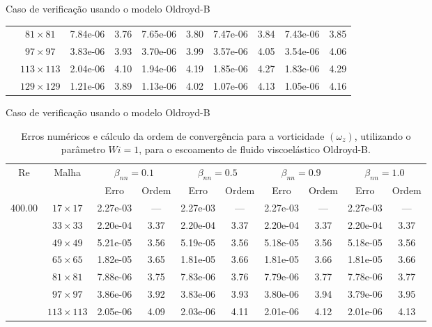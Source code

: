 \begin{frame}{Caso de verificação usando o modelo Oldroyd-B}
\begin{table}[H]
{\begin{tabular*}{\textwidth}{@{\extracolsep\fill}cccccccccc@{}}
    & $81\times 81$ & 7.84e-06 & 3.76 & 7.65e-06 & 3.80 & 7.47e-06 & 3.84 & 7.43e-06 & 3.85 \\
    & $97\times 97$ & 3.83e-06 & 3.93 & 3.70e-06 & 3.99 & 3.57e-06 & 4.05 & 3.54e-06 & 4.06 \\
    & $113\times 113$ & 2.04e-06 & 4.10 & 1.94e-06 & 4.19 & 1.85e-06 & 4.27 & 1.83e-06 & 4.29 \\
    & $129\times 129$ & 1.21e-06 & 3.89 & 1.13e-06 & 4.02 & 1.07e-06 & 4.13 & 1.05e-06 & 4.16 \\
    \hline
    \end{tabular*}
}
\end{table}
\end{frame}

\begin{frame}{Caso de verificação usando o modelo Oldroyd-B}
    \centering
    \begin{table}[H]
\caption{Erros numéricos e cálculo da ordem de convergência para a vorticidade $(\omega_{z})$, utilizando o parâmetro $Wi=1$, para o escoamento de fluido viscoelástico Oldroyd-B.\label{tab_OldroydBWzResumida_2}}
\scriptsize{
    \begin{tabular*}{\textwidth}{@{\extracolsep\fill}cccccccccc@{}}
    \hline
    \multirow{2}{*}{$\operatorname{Re}$} & \multirow{2}{*}{Malha} & \multicolumn{2}{c}{$\beta_{nn}=0.1$}  & \multicolumn{2}{c}{$\beta_{nn}=0.5$}  & \multicolumn{2}{c}{$\beta_{nn}=0.9$}  & \multicolumn{2}{c}{$\beta_{nn}=1.0$}\\ %
     & & Erro & Ordem & Erro & Ordem & Erro & Ordem & Erro & Ordem \\
    \hline
    \multirow{7}{*}{400.00} & $17\times 17$ & 2.27e-03 & --- & 2.27e-03 & --- & 2.27e-03 & --- & 2.27e-03 & --- \\
    & $33\times 33$ & 2.20e-04 & 3.37 & 2.20e-04 & 3.37 & 2.20e-04 & 3.37 & 2.20e-04 & 3.37 \\
    & $49\times 49$ & 5.21e-05 & 3.56 & 5.19e-05 & 3.56 & 5.18e-05 & 3.56 & 5.18e-05 & 3.56 \\
    & $65\times 65$ & 1.82e-05 & 3.65 & 1.81e-05 & 3.66 & 1.81e-05 & 3.66 & 1.81e-05 & 3.66 \\
    & $81\times 81$ & 7.88e-06 & 3.75 & 7.83e-06 & 3.76 & 7.79e-06 & 3.77 & 7.78e-06 & 3.77 \\
    & $97\times 97$ & 3.86e-06 & 3.92 & 3.83e-06 & 3.93 & 3.80e-06 & 3.94 & 3.79e-06 & 3.95 \\
    & $113\times 113$ & 2.05e-06 & 4.09 & 2.03e-06 & 4.11 & 2.01e-06 & 4.12 & 2.01e-06 & 4.13 \\

\end{tabular*}}
\end{table}
\end{frame}
